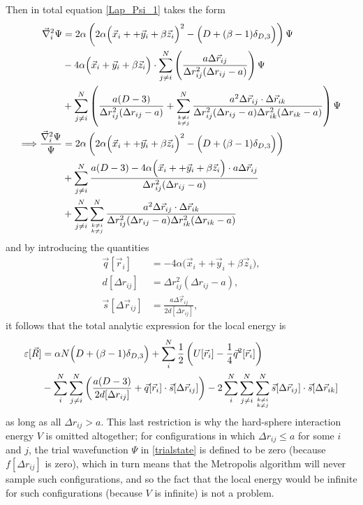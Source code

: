 \documentclass[a4paper,8pt]{article}
\begin{document}
Then in total equation \eqref{Lap_Psi_1} takes the form
\begin{align}
\vec{\nabla}_i^2\Psi &= 2\alpha\left(2\alpha\Big(\vec{x}_i++\vec{y}_i+\beta\vec{z}_i\Big)^2-\Big(D+(\beta-1)\delta_{D,3}\Big)\right) \Psi \nonumber\\
&- 4\alpha\Big(\vec{x}_i+\vec{y}_i+\beta\vec{z}_i\Big) \cdot \sum\limits_{j \neq i}^N \left(\frac{a\Delta\vec{r}_{ij}}{\Delta{r}_{ij}^2(\Delta{r}_{ij}-a)}\right) \Psi \nonumber\\
&+ \sum\limits_{j \neq i}^N \left(\frac{a(D-3)}{\Delta{r}_{ij}^2(\Delta{r}_{ij}-a)} + \sum\limits_{{k \neq i}\atop{k \neq j}}^N \frac{a^2 \Delta\vec{r}_{ij} \cdot \Delta\vec{r}_{ik}}{\Delta{r}_{ij}^2(\Delta{r}_{ij}-a) \Delta{r}_{ik}^2(\Delta{r}_{ik}-a)}\right) \Psi \nonumber\\
\Longrightarrow \frac{\vec{\nabla}_i^2\Psi}{\Psi} &= 2\alpha\left(2\alpha\Big(\vec{x}_i++\vec{y}_i+\beta\vec{z}_i\Big)^2-\Big(D+(\beta-1)\delta_{D,3}\Big)\right) \nonumber\\
&+ \sum\limits_{j \neq i}^N \frac{a(D-3) - 4\alpha\Big(\vec{x}_i++\vec{y}_i+\beta\vec{z}_i\Big) \cdot a\Delta\vec{r}_{ij}}{\Delta{r}_{ij}^2(\Delta{r}_{ij}-a)} \nonumber\\
&+ \sum\limits_{j \neq i}^N \sum\limits_{{k \neq i}\atop{k \neq j}}^N \frac{a^2 \Delta\vec{r}_{ij} \cdot \Delta\vec{r}_{ik}}{\Delta{r}_{ij}^2(\Delta{r}_{ij}-a) \Delta{r}_{ik}^2(\Delta{r}_{ik}-a)}
\end{align}
and by introducing the quantities
\begin{align}
\vec{q}[\vec{r}_i] &= -4\alpha\Big(\vec{x}_i++\vec{y}_i+\beta\vec{z}_i\Big), \label{q}\\
d[\Delta{r}_{ij}] &= \Delta{r}_{ij}^2(\Delta{r}_{ij}-a), \label{d}\\
\vec{s}[\Delta\vec{r}_{ij}] &= \frac{a\Delta\vec{r}_{ij}}{2d[\Delta{r}_{ij}]}, \label{s}
\end{align}
it follows that the total analytic expression for the local energy is
\begin{align}
\varepsilon[\vec{R}] &= \alpha N\Big(D+(\beta-1)\delta_{D,3}\Big) + \sum\limits_i^N \frac{1}{2}\left( U[\vec{r}_i] - \frac{1}{4}\vec{q}^2[\vec{r}_i] \right) \nonumber\\
&- \sum\limits_i^N \sum\limits_{j \neq i}^N \left( \frac{a(D-3)}{2d[\Delta{r}_{ij}]} + \vec{q}[\vec{r}_i] \cdot \vec{s}[\Delta\vec{r}_{ij}] \right) - 2\sum\limits_i^N \sum\limits_{j \neq i}^N \sum\limits_{{k \neq i}\atop{k \neq j}}^N \vec{s}[\Delta\vec{r}_{ij}] \cdot \vec{s}[\Delta\vec{r}_{ik}] \label{anaLocalenergy}
\end{align}
as long as all $\Delta r_{ij} > a$. This last restriction is why the hard-sphere interaction energy $V$ is omitted altogether; for configurations in which $\Delta r_{ij} \leq a$ for some $i$ and $j$, the trial wavefunction $\Psi$ in \eqref{trialstate} is defined to be zero (because $f[\Delta r_{ij}]$ is zero), which in turn means that the Metropolis algorithm will never sample such configurations, and so the fact that the local energy would be infinite for such configurations (because $V$ is infinite) is not a problem.
\end{document}
